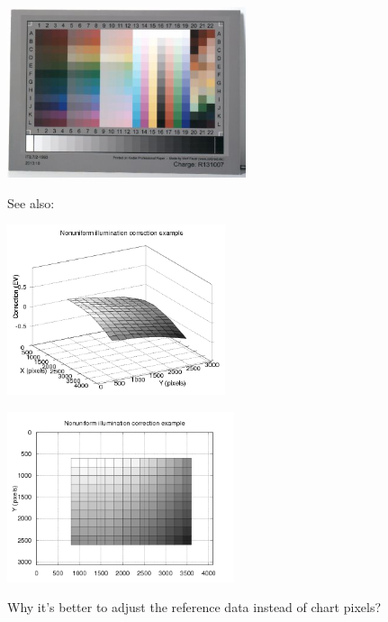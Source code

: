 {\begin{center}
\includegraphics[height=5cm]{images/it8_lum_correction}
\end{center}

See also:\\

\begin{center}
\includegraphics[height=5cm]{images/it8_lum_correction_3d}
\end{center}

\begin{center}
\includegraphics[height=5cm]{images/it8_lum_correction_2d}
\end{center}

Why it's better to adjust the reference data instead of chart pixels?\\

}

